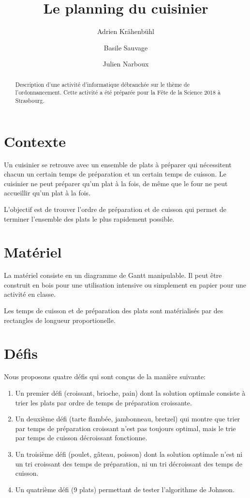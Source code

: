 \documentclass[a4paper]{article}
\title{Le planning du cuisinier}
\author{Adrien Krähenbühl \and Basile Sauvage \and Julien Narboux}
\begin{document}
\maketitle

\begin{abstract}
Description d'une activité d'informatique débranchée sur le thème de l'ordonnancement.
Cette activité a été préparée pour la Fête de la Science 2018 à Strasbourg.
\end{abstract}


\section{Contexte}

Un cuisinier se retrouve avec un ensemble de plats à préparer qui nécessitent chacun un certain temps de préparation et un certain temps de cuisson. Le cuisinier ne peut préparer qu'un plat à la fois, de même que le four ne peut accueillir qu'un plat à la fois.

L'objectif est de trouver l'ordre de préparation et de cuisson qui permet de terminer l'ensemble des plats le plus rapidement possible.

\section{Matériel}

La matériel consiste en un diagramme de Gantt manipulable. Il peut être construit en bois pour une utilisation intensive ou simplement en papier pour une activité en classe.

Les temps de cuisson et de préparation des plats sont matérialisés par des rectangles de longueur proportionelle.




\section{Défis}

Nous proposons quatre défis qui sont conçus de la manière suivante:
\begin{enumerate}
\item Un premier défi (croissant, brioche, pain) dont la solution optimale consiste à trier les plats par ordre de temps de préparation croissante.
\item Un deuxième défi (tarte flambée, jambonneau, bretzel) qui montre que trier par temps de préparation croissant n'est pas toujours optimal, mais le trie par temps de cuisson décroissant fonctionne.
\item Un troisième défi (poulet, gâteau, poisson) dont la solution optimale n'est ni un tri croissant des temps de préparation, ni un tri décroissant des temps de cuisson.
\item Un quatrième défi (9 plats) permettant de tester l'algorithme de Johnson.
\end{enumerate}
\end{document}
